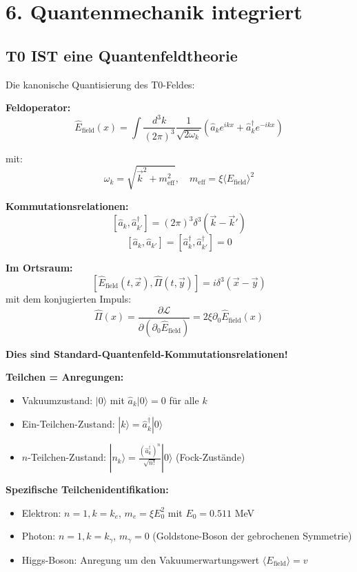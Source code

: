 	\section*{6. Quantenmechanik integriert}
	
	\subsection*{\textbf{T0 IST eine Quantenfeldtheorie}}
	
	Die kanonische Quantisierung des T0-Feldes:
	
	\textbf{Feldoperator:}
	\[
	\hat{E}_{\text{field}}(x) = \int \frac{d^3k}{(2\pi)^3} \frac{1}{\sqrt{2\omega_k}} \left(\hat{a}_k e^{ikx} + \hat{a}^\dagger_k e^{-ikx}\right)
	\]
	
	mit:
	\[
	\omega_k = \sqrt{\vec{k}^2 + m_{\text{eff}}^2}, \quad m_{\text{eff}} = \xi \langle E_{\text{field}} \rangle^2
	\]
	
	\textbf{Kommutationsrelationen:}
	\[
	[\hat{a}_k, \hat{a}^\dagger_{k'}] = (2\pi)^3 \delta^3(\vec{k} - \vec{k}')
	\]
	\[
	[\hat{a}_k, \hat{a}_{k'}] = [\hat{a}^\dagger_k, \hat{a}^\dagger_{k'}] = 0
	\]
	
	\textbf{Im Ortsraum:}
	\[
	[\hat{E}_{\text{field}}(t, \vec{x}), \hat{\Pi}(t, \vec{y})] = i \delta^3(\vec{x} - \vec{y})
	\]
	mit dem konjugierten Impuls:
	\[
	\hat{\Pi}(x) = \frac{\partial \mathcal{L}}{\partial (\partial_0 \hat{E}_{\text{field}})} = 2\xi \partial_0 \hat{E}_{\text{field}}(x)
	\]
	
	\textbf{Dies sind Standard-Quantenfeld-Kommutationsrelationen!}
	
	\textbf{Teilchen = Anregungen:}
	\begin{itemize}
		\item Vakuumzustand: $|0\rangle$ mit $\hat{a}_k |0\rangle = 0$ für alle $k$
		\item Ein-Teilchen-Zustand: $|k\rangle = \hat{a}^\dagger_k |0\rangle$
		\item $n$-Teilchen-Zustand: $|n_k\rangle = \frac{(\hat{a}^\dagger_k)^n}{\sqrt{n!}} |0\rangle$ (Fock-Zustände)
	\end{itemize}
	
	\textbf{Spezifische Teilchenidentifikation:}
	\begin{itemize}
		\item Elektron: $n=1, k=k_e$, $m_e = \xi E_0^2$ mit $E_0 = 0.511$ MeV
		\item Photon: $n=1, k=k_\gamma$, $m_\gamma = 0$ (Goldstone-Boson der gebrochenen Symmetrie)
		\item Higgs-Boson: Anregung um den Vakuumerwartungswert $\langle E_{\text{field}} \rangle = v$
	\end{itemize}
	
